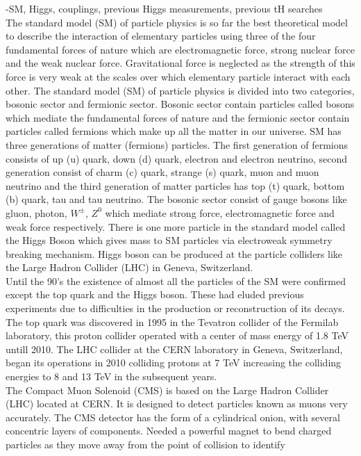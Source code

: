 \documentclass[final,3p]{CSP}
\begin{document}
-SM, Higgs, couplings, previous Higgs measurements, previous tH searches\\
\onehalfspacing The standard model (SM) of particle physics is so far the best theoretical model to describe the interaction of elementary 
particles using three of the four fundamental forces of nature which are electromagnetic force, strong nuclear force and the 
weak nuclear force. Gravitational force is neglected as the strength of this force is very weak at the scales over which 
elementary particle interact with each other. The standard model (SM) of particle physics is divided into two categories, 
bosonic sector and fermionic sector. Bosonic sector contain particles called bosons which mediate the fundamental forces of 
nature and the fermionic sector contain particles called fermions which make up all the matter in our universe. SM has three 
generations of matter (fermions) particles. The first generation of fermions consists of up (u) quark, down (d) quark, electron 
and electron neutrino, second generation consist of charm (c) quark, strange (s) quark, muon and muon neutrino and the third 
generation of matter particles has top (t) quark, bottom (b) quark, tau and tau neutrino. The bosonic sector consist of gauge 
bosons like gluon, photon, $W^{\pm}$, $Z^0$ which mediate strong force, electromagnetic force and weak force respectively. There is one more particle in the standard model called the Higgs Boson which gives mass to SM particles via electroweak symmetry breaking mechanism. Higgs boson can be produced at the particle colliders like the Large Hadron Collider (LHC) in Geneva, Switzerland. \\
Until the 90's the existence of almost all the particles of the SM were confirmed except the top quark and the Higgs boson. 
These had eluded previous experiments due to difficulties in the production or reconstruction of its decays. The top quark was 
discovered in 1995 in the Tevatron collider of the Fermilab laboratory, this proton collider operated with a center of mass 
energy of 1.8 TeV untill 2010. The LHC collider at the CERN laboratory in Geneva, Switzerland, began its operations in 2010 
colliding protons at 7 TeV increasing the colliding energies to 8 and 13 TeV in the subsequent years.\\
The Compact Muon Solenoid (CMS) is based on the Large Hadron Collider (LHC) located at CERN. It is designed to detect 
particles known as muons very accurately. The CMS detector has the form of a cylindrical onion, with several concentric layers 
of components. Needed a powerful magnet to bend charged particles as they move away from the point of collision to identify 
\end{document}
